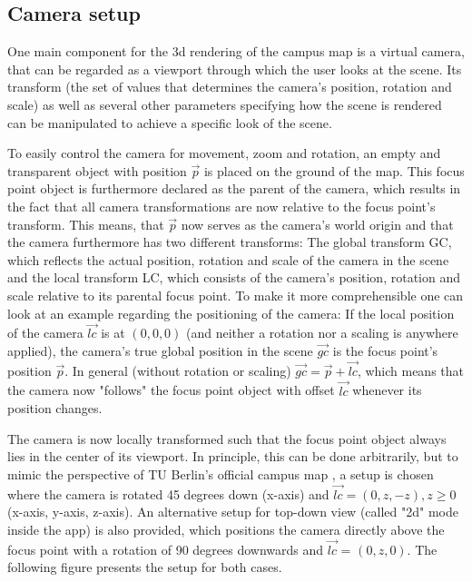 \subsection{Camera setup}
One main component for the 3d rendering of the campus map is a virtual camera, that can be regarded as a viewport through which the user looks at the scene. Its transform (the set of values that determines the camera's position, rotation and scale) as well as several other parameters specifying how the scene is rendered can be manipulated to achieve a specific look of the scene.

To easily control the camera for movement, zoom and rotation, an empty and transparent object with position $\overrightarrow{p}$ is placed on the ground of the map. This focus point object is furthermore declared as the parent of the camera, which results in the fact that all camera transformations are now relative to the focus point's transform. This means, that $\overrightarrow{p}$ now serves as the camera's world origin and that the camera furthermore has two different transforms: The global transform GC, which reflects the actual position, rotation and scale of the camera in the scene and the local transform LC, which consists of the camera's position, rotation and scale relative to its parental focus point. To make it more comprehensible one can look at an example regarding the positioning of the camera: If the local position of the camera $\overrightarrow{lc}$ is at $(0, 0, 0)$ (and neither a rotation nor a scaling is anywhere applied), the camera's true global position in the scene $\overrightarrow{gc}$ is the focus point's position $\overrightarrow{p}$. In general (without rotation or scaling) $\overrightarrow{gc} = \overrightarrow{p} + \overrightarrow{lc}$, which means that the camera now "follows" the focus point object with offset $\overrightarrow{lc}$ whenever its position changes.

The camera is now locally transformed such that the focus point object always lies in the center of its viewport. In principle, this can be done arbitrarily, but to mimic the perspective of TU Berlin's official campus map \cite{campus_plan}, a setup is chosen where the camera is rotated 45 degrees down (x-axis) and $\overrightarrow{lc} = (0, z, -z), z \geq 0$ (x-axis, y-axis, z-axis). An alternative setup for top-down view (called "2d" mode inside the app) is also provided, which positions the camera directly above the focus point with a rotation of 90 degrees downwards and $\overrightarrow{lc}$ = $(0, z, 0)$. The following figure presents the setup for both cases.

